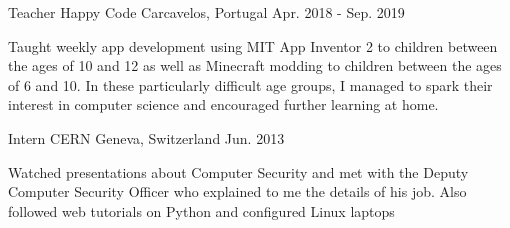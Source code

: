 \begin{cventries}
  \cventry
  {Teacher}
  {Happy Code}
  {Carcavelos, Portugal}
  {Apr. 2018 - Sep. 2019}
  {
    \begin{cvitems}
      \item {Taught weekly app development using MIT App Inventor 2 to children between the ages of 10 and 12 as well as Minecraft modding to children between the ages of 6 and 10. In these particularly difficult age groups, I managed to spark their interest in computer science and encouraged further learning at home.}
    \end{cvitems}
  }

  \cventry
  {Intern}
  {CERN}
  {Geneva, Switzerland}
  {Jun. 2013}
  {
    \begin{cvitems}
      \item {Watched presentations about Computer Security and met with the Deputy Computer Security Officer who explained to me the details of his job. Also followed web tutorials on Python and configured Linux laptops}
    \end{cvitems}
  }
\end{cventries}